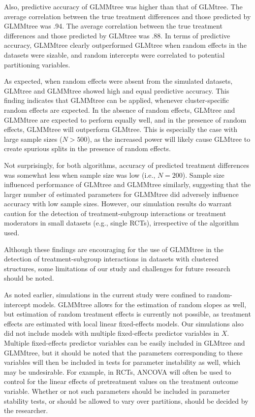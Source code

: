 \documentclass[nobf,doc]{apa}
\begin{document}
Also, predictive accuracy of GLMMtree was higher than that of GLMtree. The average correlation between the true treatment differences and those predicted by GLMMtree was .94.  The average correlation between the true treatment differences and those predicted by GLMtree was .88. In terms of predictive accuracy, GLMMtree clearly outperformed GLMtree when random effects in the datasets were sizable, and random intercepts were correlated to potential partitioning variables.

As expected, when random effects were absent from the simulated datasets, GLMtree and GLMMtree showed high and equal predictive accuracy. This finding indicates that GLMMtree can be applied, whenever cluster-specific random effects are expected. In the absence of random effects, GLMtree and GLMMtree are expected to perform equally well, and in the presence of random effects, GLMMtree will outperform GLMtree. This is especially the case with large sample sizes ($N > 500$), as the increased power will likely cause GLMtree to create spurious splits in the presence of random effects. 

Not surprisingly, for both algorithms, accuracy of predicted treatment differences was somewhat less when sample size was low (i.e., $N=200$). Sample size influenced performance of GLMtree and GLMMtree similarly, suggesting that the larger number of estimated parameters for GLMMtree did adversely influence accuracy with low sample sizes. However, our simulation results do warrant caution for the detection of treatment-subgroup interactions or treatment moderators in small datasets (e.g., single RCTs), irrespective of the algorithm used. 

Although these findings are encouraging for the use of GLMMtree in the detection of treatment-subgroup interactions in datasets with clustered structures, some limitations of our study and challenges for future research should be noted.

As noted earlier, simulations in the current study were confined to random-intercept models. GLMMtree allows for the estimation of random slopes as well, but estimation of random treatment effects is currently not possible, as treatment effects are estimated with local linear fixed-effects models. Our simulations also did not include models with multiple fixed-effects predictor variables in $X$. Multiple fixed-effects predictor variables can be easily included in GLMtree and GLMMtree, but it should be noted that the parameters corresponding to these variables will then be included in tests for parameter instability as well, which may be undesirable. For example, in RCTs, ANCOVA will often be used to control for the linear effects of pretreatment values on the treatment outcome variable. Whether or not such parameters should be included in parameter stability tests, or should be allowed to vary over partitions, should be decided by the researcher.     
\end{document}
